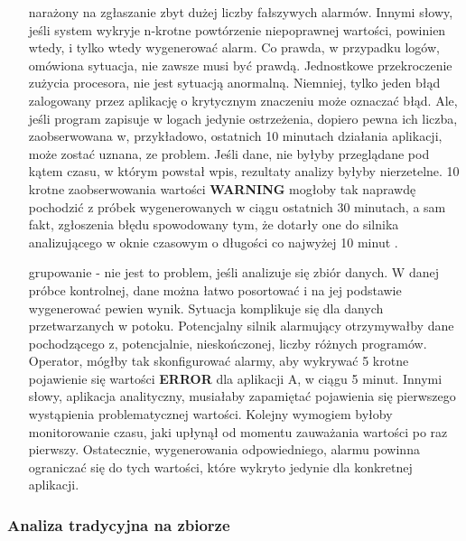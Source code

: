 \begin{itemize}
        narażony na zgłaszanie zbyt dużej liczby fałszywych alarmów. Innymi słowy, jeśli system wykryje n-krotne powtórzenie 
        niepoprawnej wartości, powinien wtedy, i tylko wtedy wygenerować alarm. 
        Co prawda, w przypadku logów, omówiona sytuacja, nie zawsze musi być prawdą. Jednostkowe przekroczenie zużycia procesora, nie jest sytuacją anormalną.
        Niemniej, tylko jeden błąd zalogowany przez aplikację o krytycznym znaczeniu może oznaczać błąd. Ale, jeśli program zapisuje w logach jedynie ostrzeżenia,
        dopiero pewna ich liczba, zaobserwowana w, przykładowo, ostatnich 10 minutach działania aplikacji, może zostać uznana, ze problem. Jeśli dane, nie byłyby
        przeglądane pod kątem czasu, w którym powstał wpis, rezultaty analizy byłyby nierzetelne. 10 krotne zaobserwowania wartości \textbf{WARNING} mogłoby tak naprawdę
        pochodzić z próbek wygenerowanych w ciągu ostatnich 30 minutach, a sam fakt, zgłoszenia błędu spowodowany tym, że dotarły one do silnika analizującego
        w oknie czasowym o długości co najwyżej 10 minut \cite{8_requirements_of_real_time_processing}.
        \item[grupowanie] - nie jest to problem, jeśli analizuje się zbiór danych. W danej próbce kontrolnej, dane można łatwo posortować i na jej podstawie 
        wygenerować pewien wynik. Sytuacja komplikuje się dla danych przetwarzanych w potoku. Potencjalny silnik alarmujący otrzymywałby dane pochodzącego z,
        potencjalnie, nieskończonej, liczby różnych programów. Operator, mógłby tak skonfigurować alarmy, aby wykrywać 5 krotne pojawienie się wartości \textbf{ERROR}
        dla aplikacji A, w ciągu 5 minut. Innymi słowy, aplikacja analityczny, musiałaby zapamiętać pojawienia się pierwszego wystąpienia problematycznej wartości.
        Kolejny wymogiem byłoby monitorowanie czasu, jaki upłynął od momentu zauważania wartości po raz pierwszy. Ostatecznie, wygenerowania odpowiedniego,
        alarmu powinna ograniczać się do tych wartości, które wykryto jedynie dla konkretnej aplikacji.
    \end{itemize}
    
    \subsubsection{Analiza tradycyjna na zbiorze}
    \label{chapter:application:plans:alarm_on_logs:bulk}
    
